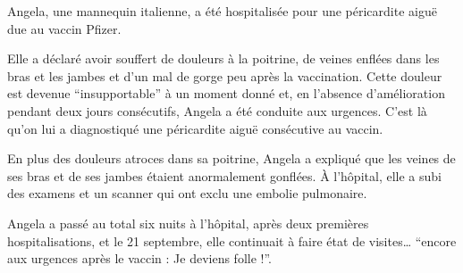 Angela, une mannequin italienne, a été hospitalisée pour une péricardite aiguë
due au vaccin Pfizer.

Elle a déclaré avoir souffert de douleurs à la poitrine, de veines enflées dans
les bras et les jambes et d'un mal de gorge peu après la vaccination. Cette
douleur est devenue “insupportable” à un moment donné et, en l'absence
d'amélioration pendant deux jours consécutifs, Angela a été conduite aux
urgences. C'est là qu'on lui a diagnostiqué une péricardite aiguë consécutive au
vaccin.

En plus des douleurs atroces dans sa poitrine, Angela a expliqué que les veines
de ses bras et de ses jambes étaient anormalement gonflées. À l'hôpital, elle a
subi des examens et un scanner qui ont exclu une embolie pulmonaire.

Angela a passé au total six nuits à l'hôpital, après deux premières
hospitalisations, et le 21 septembre, elle continuait à faire état de visites…
“encore aux urgences après le vaccin : Je deviens folle !”.

